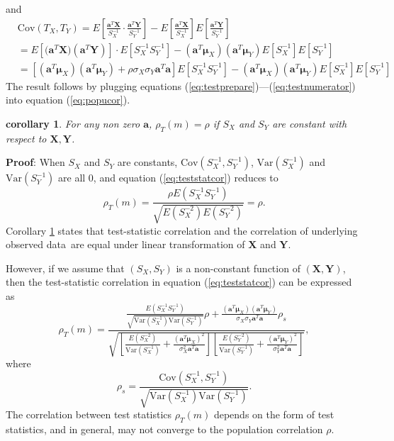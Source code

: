 \documentclass[12pt, a4paper]{article}
\newtheorem{corollary}{corollary}
\newcommand{\cov}{\text{Cov}}
\newcommand{\var}{\text{Var}}
\newcommand{\popucor}{the correlation of underlying observed data}
\begin{document}
and
\begin{equation}\label{eq:testnumerator}
\begin{aligned}
&\cov(T_X, T_Y) = E\left[\frac{ \bm a^T\bm X }{S_X^{-1}}\cdot\frac{ \bm a^T\bm Y 
}{S_Y^{-1}}\right] - E\left[\frac{\bm a^T\bm X}{S_X^{-1}}\right]E\left[\frac{\bm a^T\bm 
Y}{S_Y^{-1}}\right] \\
& = E[\bm (\bm a^T\bm X)(\bm a^T\bm Y)]\cdot E[S_X^{-1}S_Y^{-1}]-(\bm a^T\bm \mu_X)(\bm a^T\bm 
\mu_Y)E[S_X^{-1}]E[S_Y^{-1}]\\
& = [(\bm a^T\bm \mu_X)(\bm a^T\bm \mu_Y)+ \rho \sigma_X\sigma_Y\bm a^T\bm 
a]E[S_X^{-1}S_Y^{-1}]- (\bm a^T\bm \mu_X)(\bm a^T\bm \mu_Y)E[S_X^{-1}]E[S_Y^{-1}]
\end{aligned}
\end{equation}	
The result follows by plugging equations (\ref{eq:testprepare})---(\ref{eq:testnumerator}) into 
equation (\ref{eq:popucor}).

\begin{corollary}\label{thm:lineartransformation} 
	For any non zero $\bm a$, $\rho_T(m)=\rho$ if $S_X$ and $S_Y$ are constant with respect to 
	$\bm X, \bm Y$. 
\end{corollary}
\textbf{Proof}: When $S_X$ and $S_Y$ are constants, $\cov(S_X^{-1}, S_Y^{-1})$, $\var(S_X^{-1}) 
$ and $\var(S_Y^{-1})$ are all 0, and equation (\ref{eq:teststatcor}) reduces to 
\begin{equation}
\rho_T(m) = \frac{\rho E(S_X^{-1}S_Y^{-1})}{\sqrt{E(S_X^{-2})E(S_Y^{-2})}} = \rho.
\end{equation}
Corollary \ref{thm:lineartransformation} states that test-statistic correlation and \popucor~are 
equal under linear transformation of $\bm X$ and $\bm Y$. 

However, if we 
assume that $(S_X, S_Y)$ is a non-constant function of $(\bm X, \bm Y)$, then the test-statistic 
correlation in equation (\ref{eq:teststatcor}) can be expressed as  
\begin{equation}
\rho_T(m) = \frac{ \frac{E(S_X^{-1}S_Y^{-1})}
	{\sqrt{\var(S_X^{-1})\var(S_Y^{-1})}}\rho + \frac{(\bm a^T\bm \mu_X)(\bm a^T\bm 
		\mu_Y)}{\sigma_X\sigma_Y\bm a^T\bm a} \rho_s	
}{\sqrt{\left[ \frac{E(S_X^{-2})}{\var(S_X^{-1})} + \frac{(\bm a^T\bm \mu_X)^2}{\sigma_X^2\bm 
		a^T\bm a}\right]\left[ \frac{E(S_Y^{-2})}{\var(S_Y^{-1})} + \frac{(\bm a^T\bm 
		\mu_Y)^2}{\sigma_Y^2\bm a^T\bm a}\right]}}, 
\end{equation}
where 
\begin{equation}
\rho_s = \frac{\cov(S_X^{-1},S_Y^{-1})}{\sqrt{\var(S_X^{-1})\var(S_Y^{-1})}}.
\end{equation}
The correlation between test statistics $\rho_T(m)$ depends on the form of test statistics, and 
in general,  may not converge to the population correlation $\rho$. 
\end{document}
